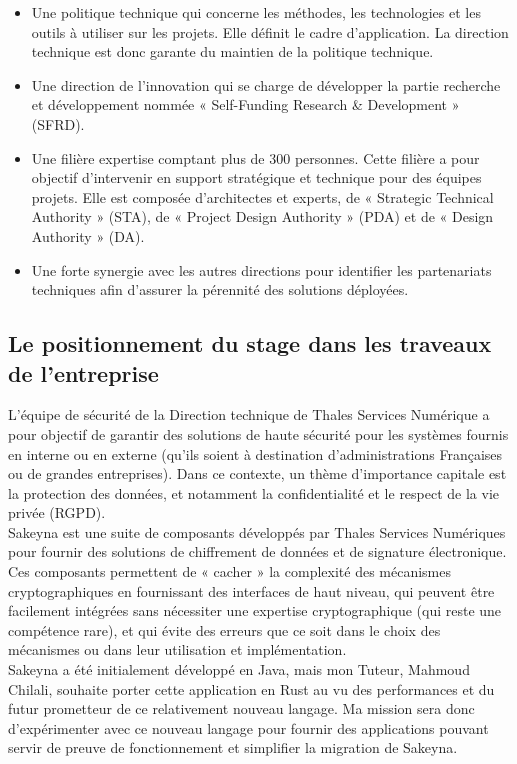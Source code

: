 \documentclass[a4paper, 12pt]{article}
\begin{document}
\begin{itemize}
	\item Une politique technique qui concerne les méthodes, les technologies et les outils à utiliser sur les projets. Elle définit le cadre d’application. La direction technique est donc garante du maintien de la politique technique.
	\item Une direction de l’innovation qui se charge de développer la partie recherche et développement nommée « Self-Funding Research \& Development » (SFRD).
	\item Une filière expertise comptant plus de 300 personnes. Cette filière a pour objectif d’intervenir en support stratégique et technique pour des équipes projets. Elle est composée d’architectes et experts, de « Strategic Technical Authority » (STA), de « Project Design Authority » (PDA) et de « Design Authority » (DA).
	\item Une forte synergie avec les autres directions pour identifier les partenariats techniques afin d’assurer la pérennité des solutions déployées.
\end{itemize}

\subsection{Le positionnement du stage dans les traveaux de l'entreprise}

L’équipe de sécurité de la Direction technique de Thales Services Numérique a pour objectif de garantir des solutions de haute sécurité pour les systèmes fournis en interne ou en externe (qu’ils soient à destination d’administrations Françaises ou de grandes entreprises). Dans ce contexte, un thème d’importance capitale est la protection des données, et notamment la confidentialité et le respect de la vie privée (RGPD). \\

Sakeyna est une suite de composants développés par Thales Services Numériques pour fournir des solutions de chiffrement de données et de signature électronique. Ces composants permettent de « cacher » la complexité des mécanismes cryptographiques en fournissant des interfaces de haut niveau, qui peuvent être facilement intégrées sans nécessiter une expertise cryptographique (qui reste une compétence rare), et qui évite des erreurs que ce soit dans le choix des mécanismes ou dans leur utilisation et implémentation. \\

Sakeyna a été initialement développé en Java, mais mon Tuteur, Mahmoud Chilali, souhaite porter cette application en Rust au vu des performances et du futur prometteur de ce relativement nouveau langage. Ma mission sera donc d'expérimenter avec ce nouveau langage pour fournir des applications pouvant servir de preuve de fonctionnement et simplifier la migration de Sakeyna.
\end{document}
